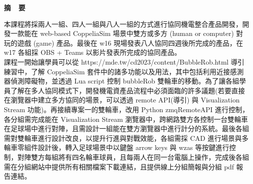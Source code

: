 \renewcommand{\baselinestretch}{1.5} %
\clearpage  %
\sectionef
{} %
\begin{center}
\LARGE\textbf{摘~~要}\\
\end{center}
\begin{flushleft}
\fontsize{14pt}{20pt}\sectionef\hspace{12pt}\quad 本課程將採兩人一組、四人一組與八人一組的方式進行協同機電整合產品開發，開發一款能在 web-based CoppeliaSim 場景中雙方或多方 (human or computer) 對玩的遊戲 (game) 產品。最後在 w16 現場發表八人協同四週後所完成的產品，在 w17 各組採 OBS + Teams 以影片發表所完成的協同產品。\\[12pt]

\fontsize{14pt}{20pt}\sectionef\hspace{12pt}\quad 課程一開始讓學員可以從 https://mde.tw/cd2023/content/BubbleRob.html 導引練習中，了解 CoppeliaSim 套件中的諸多功能以及用法，其中包括利用近接感測器偵測障礙物，並透過 Lua script 控制 bubbleRob 雙輪車的移動。為了讓各組學員了解在多人協同模式下，開發機電資產品流程中必須面臨的許多議題(若要直接在瀏覽器中建立多方協同的場景，可以透過 remote API(導引) 與 Visualization Stream 功能)。再接續專案一的雙輪車，改用 Python zmqRemoteAPI 進行控制，各分組需完成能在 Visualization Stream 瀏覽器中，跨網路雙方各控制一台雙輪車在足球場中進行對陣，且需設計一組能在雙方瀏覽器中進行計分的系統。最後各組需對雙輪車進行設計改良，以提升行進與對戰效能，各組需採 CAD 進行場景與多輪車零組件設計後，轉入足球場景中以鍵盤 arrow keys 與 wzas 等按鍵進行控制，對陣雙方每組將有四名輪車球員，且每兩人在同一台電腦上操作，完成後各組需在分組網站中提供所有相關檔案下載連結，且提供線上分組簡報與分組 pdf 報告連結。\\[12pt]


\end{flushleft}
